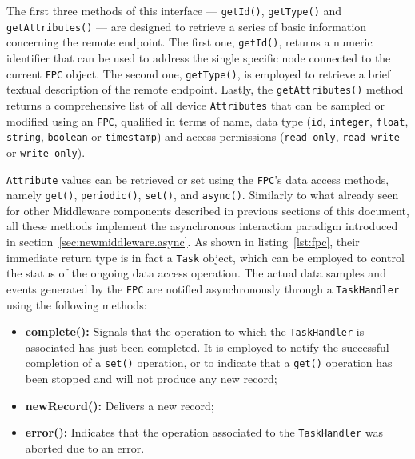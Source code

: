 The first three methods of this interface --- \texttt{getId()},
\texttt{getType()} and \texttt{getAttributes()} --- are designed to retrieve a
series of basic information concerning the remote endpoint. The first one,
\texttt{getId()}, returns a numeric identifier that can be used to address the
single specific node connected to the current \texttt{FPC} object. The second
one, \texttt{getType()}, is employed to retrieve a brief textual description of
the remote endpoint. Lastly, the \texttt{getAttributes()} method returns a
comprehensive list of all device \texttt{Attributes} that can be sampled or
modified using an \texttt{FPC}, qualified in terms of name, data type
(\texttt{id}, \texttt{integer}, \texttt{float}, \texttt{string},
\texttt{boolean} or \texttt{timestamp}) and access permissions
(\texttt{read-only}, \texttt{read-write} or \texttt{write-only}).

\texttt{Attribute} values can be retrieved or set using the \texttt{FPC}'s data
access methods, namely \texttt{get()}, \texttt{periodic()}, \texttt{set()}, and
\texttt{async()}. Similarly to what already seen for other Middleware
components described in previous sections of this document, all these methods
implement the asynchronous interaction paradigm introduced in
section~\ref{sec:newmiddleware.async}. As shown in listing~\ref{lst:fpc}, their
immediate return type is in fact a \texttt{Task} object, which can be employed
to control the status of the ongoing data access operation. The actual data
samples and events generated by the \texttt{FPC} are notified asynchronously
through a \texttt{TaskHandler} using the following methods:

\begin{itemize}

    \item \textbf{complete():} Signals that the operation to which the
        \texttt{TaskHandler} is associated has just been completed. It is
        employed to notify the successful completion of a \texttt{set()}
        operation, or to indicate that a \texttt{get()} operation has been
        stopped and will not produce any new record;

    \item \textbf{newRecord():} Delivers a new record;

    \item \textbf{error():} Indicates that the operation associated to the
        \texttt{TaskHandler} was aborted due to an error.
\end{itemize}

